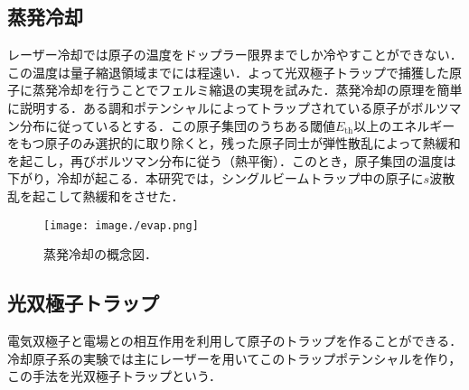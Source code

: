 \documentclass[11pt,a4j,notitlepage]{jreport}
\begin{document}
\subsection{蒸発冷却}
レーザー冷却では原子の温度をドップラー限界までしか冷やすことができない．この温度は量子縮退領域までには程遠い．よって光双極子トラップで捕獲した原子に蒸発冷却を行うことでフェルミ縮退の実現を試みた．蒸発冷却の原理を簡単に説明する．ある調和ポテンシャルによってトラップされている原子がボルツマン分布に従っているとする．この原子集団のうちある閾値$E_{\mathrm{th}}$以上のエネルギーをもつ原子のみ選択的に取り除くと，残った原子同士が弾性散乱によって熱緩和を起こし，再びボルツマン分布に従う（熱平衡）．このとき，原子集団の温度は下がり，冷却が起こる．本研究では，シングルビームトラップ中の原子に$s$波散乱を起こして熱緩和をさせた．
\begin{figure}[h]
	\centering
		\texttt{[image: image./evap.png]}
	\caption{蒸発冷却の概念図．}
	\label{fig2.3.3}
\end{figure}

\subsection{光双極子トラップ}
電気双極子と電場との相互作用を利用して原子のトラップを作ることができる．冷却原子系の実験では主にレーザーを用いてこのトラップポテンシャルを作り，この手法を光双極子トラップという．
\end{document}
